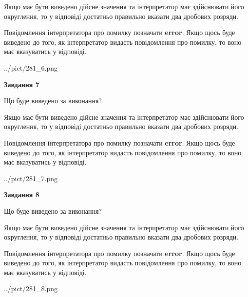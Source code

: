 \documentclass[12pt, ukrainian]{article}
\begin{document}
{\begin {Large}
Якщо має бути виведено дійсне значення та інтерпретатор має здійснювати його округлення, 
то у відповіді достатньо правильно вказати два дробових розряди.

Повідомлення інтерпретатора про помилку позначати \textbf{error}.
Якщо щось буде виведено до того, як інтерпретатор видасть повідомлення про помилку, 
то воно має вказуватись у відповіді. \par

\begin{center}
	{../pict/281_6.png}
\end{center}
\newpage

{\begin {center}\textbf{Завдання 7}\end {center}}\par
Що буде виведено за виконання? \par

Якщо має бути виведено дійсне значення та інтерпретатор має здійснювати його округлення, 
то у відповіді достатньо правильно вказати два дробових розряди.

Повідомлення інтерпретатора про помилку позначати \textbf{error}.
Якщо щось буде виведено до того, як інтерпретатор видасть повідомлення про помилку, 
то воно має вказуватись у відповіді. \par

\begin{center}
	{../pict/281_7.png}
\end{center}
\newpage

{\begin {center}\textbf{Завдання 8}\end {center}}\par
Що буде виведено за виконання? \par

Якщо має бути виведено дійсне значення та інтерпретатор має здійснювати його округлення, 
то у відповіді достатньо правильно вказати два дробових розряди.

Повідомлення інтерпретатора про помилку позначати \textbf{error}.
Якщо щось буде виведено до того, як інтерпретатор видасть повідомлення про помилку, 
то воно має вказуватись у відповіді. \par

\begin{center}
	{../pict/281_8.png}
\end{center}
\newpage


\end{Large}}
\end{document}
